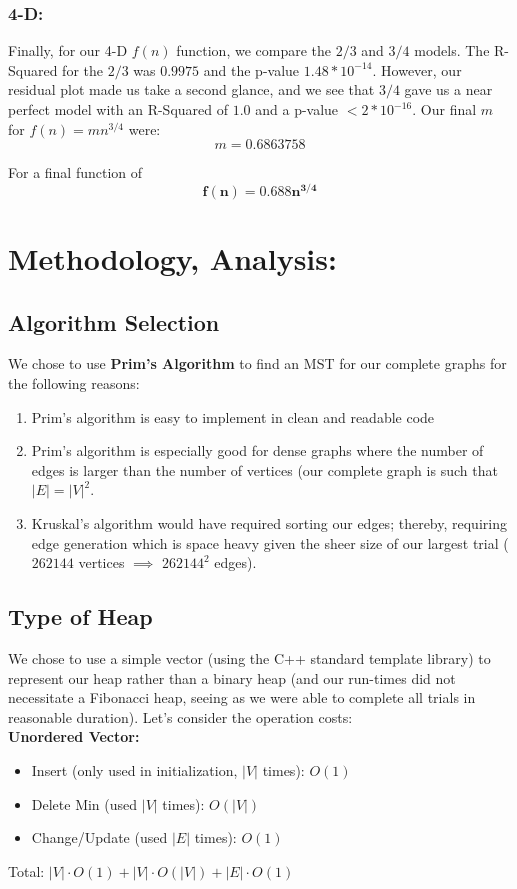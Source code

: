 \documentclass[conference]{styles/acmsiggraph}
\newcommand{\?}{\stackrel{?}{=}}
\begin{document}
\subsubsection{4-D:}

Finally, for our 4-D $f(n)$ function, we compare the $2/3$ and $3/4$ models.  The R-Squared for the $2/3$ was $0.9975$ and the p-value $1.48*10^{-14}$.  However, our residual plot made us take a second glance, and we see that $3/4$ gave us a near perfect model with an R-Squared of $1.0$ and a p-value $<2*10^{-16}$.  Our final $m$ for $f(n) = mn^{3/4}$ were: $$m=0.6863758$$

For a final function of $$\mathbf{f(n) = 0.688n^{3/4}}$$

\newpage
\section{Methodology, Analysis:}
\subsection{Algorithm Selection}
We chose to use \textbf{Prim's Algorithm} to find an MST for our complete graphs for the following reasons:
\begin{enumerate}
    \item Prim's algorithm is easy to implement in clean and readable code
    \item Prim's algorithm is especially good for dense graphs where the number of edges is larger than the number of vertices (our complete graph is such that $|E| = |V|^2$.
    \item Kruskal's algorithm would have required sorting our edges; thereby, requiring edge generation which is space heavy given the sheer size of our largest trial ($262144$ vertices $\implies$ $262144^2$ edges).
\end{enumerate}

\subsection{Type of Heap} \label{section:heapType}
We chose to use a simple vector (using the C++ standard template library) to represent our heap rather than a binary heap (and our run-times did not necessitate a Fibonacci heap, seeing as we were able to complete all trials in reasonable duration).  Let's consider the operation costs:\\

\textbf{Unordered Vector:}
\begin{itemize}
    \item Insert (only used in initialization, $|V|$ times): $O(1)$
    \item Delete Min (used $|V|$ times): $O(|V|)$
    \item Change/Update (used $|E|$ times): $O(1)$ \\
\end{itemize}
Total: $|V| \cdot O(1) + |V| \cdot O(|V|) + |E| \cdot O(1)$\\
\end{document}

